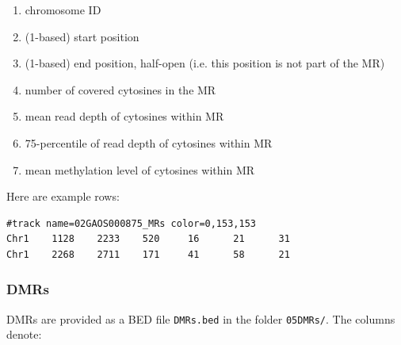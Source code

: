 \documentclass{article}
\begin{document}
\begin{enumerate}
	\item chromosome ID
	\item (1-based) start position
	\item (1-based) end position, half-open (i.e. this position is not part of the MR)
	\item number of covered cytosines in the MR
	\item mean read depth of cytosines within MR
	\item 75-percentile of read depth of cytosines within MR
	\item mean methylation level of cytosines within MR
\end{enumerate}

\noindent Here are example rows:
\begin{lstlisting}
#track name=02GAOS000875_MRs color=0,153,153
Chr1    1128    2233    520     16      21      31
Chr1    2268    2711    171     41      58      21
\end{lstlisting}

\subsubsection*{DMRs}

DMRs are provided as a BED file \verb|DMRs.bed| in the folder \verb|05DMRs/|. The columns denote:
\end{document}
